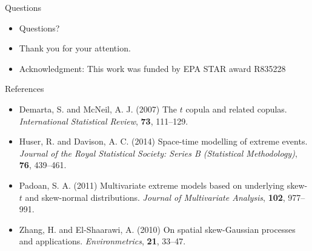 \documentclass{beamer}
\begin{document}
\begin{frame}{Questions}
  \begin{itemize} \setlength{\itemsep}{0.5em}
    \item Questions?
    \item Thank you for your attention.
    \item Acknowledgment: This work was funded by EPA STAR award R835228
  \end{itemize}
\end{frame}

\begin{frame}{References}
  \begin{itemize} \setlength{\itemsep}{0.5em}
    \item Demarta, S. and McNeil, A. J. (2007) The $t$ copula and related copulas. {\it International Statistical Review}, {\bf 73}, 111--129.
    \item Huser, R. and Davison, A. C. (2014) Space-time modelling of extreme events. {\it Journal of the Royal Statistical Society: Series B (Statistical Methodology)}, {\bf 76}, 439--461.
    \item Padoan, S. A. (2011) Multivariate extreme models based on underlying skew-$t$ and skew-normal distributions. {\it Journal of Multivariate Analysis}, {\bf 102}, 977--991.
    \item Zhang, H. and El-Shaarawi, A. (2010) On spatial skew-Gaussian processes and applications. {\it Environmetrics}, {\bf 21}, 33--47.
  \end{itemize}
\end{frame}
\end{document}
